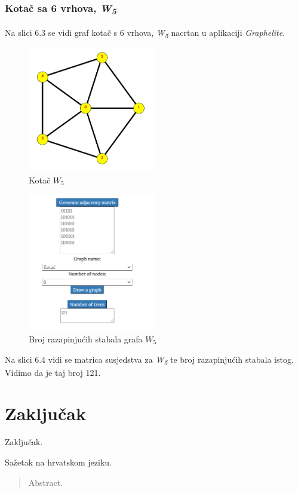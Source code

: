 \documentclass[times, utf8, zavrsni]{fer}
\begin{document}
\subsection{Kotač sa 6 vrhova, \textit{W\textsubscript{5}}}

Na slici 6.3 se vidi graf kotač s 6 vrhova, \textit{W\textsubscript{5}} nacrtan u aplikaciji \textit{Graphelite}.

\begin{figure}[htb]
	\centering
	\includegraphics[width=0.5\textwidth]{slike/kotac2.png}
	\caption{Kotač $W_5$}
	\label{fig:kotac}
\end{figure}

\begin{figure}[htb]
	\centering
	\includegraphics[width=0.5\textwidth]{slike/kotacbroj.png}
	\caption{Broj razapinjućih stabala grafa $W_5$}
	\label{fig:kotac-broj}
\end{figure}

Na slici 6.4 vidi se matrica susjedstva za \textit{W\textsubscript{5}} te broj razapinjućih stabala istog. Vidimo da je taj broj 121.
\chapter{Zaključak}
Zaključak.




\begin{sazetak}
Sažetak na hrvatskom jeziku.

\end{sazetak}

\begin{abstract}
Abstract.

\end{abstract}
\end{document}
